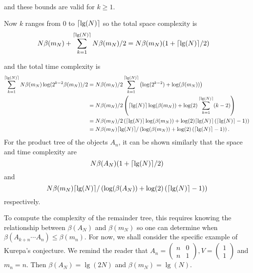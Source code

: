 and these bounds are valid for $k\geq 1$.

Now $k$ ranges from $0$ to $\lceil\lg(N)\rceil$ so the total space complexity is 
\begin{align*} 
N\beta(m_N)+\sum_{k=1}^{\lceil\lg(N)\rceil} N\beta(m_N)/2 &= N\beta(m_N)(1+\lceil\lg(N)\rceil/2)
\end{align*}

and the total time complexity is \begin{align*} 
\sum_{k=1}^{\lceil\lg(N)\rceil} N\beta(m_N)\log(2^{k-2}\beta(m_N))/2 &= N\beta(m_N)/2 \sum_{k=1}^{\lceil\lg(N)\rceil}\left( \log(2^{k-2})+\log(\beta(m_N))\right) \\
&=N\beta(m_N)/2 \left(\lceil\lg(N)\rceil\log(\beta(m_N)) +\log(2) \sum_{k=1}^{\lceil\lg(N)\rceil}(k-2)\right)\\
&=N\beta(m_N)/2 \left(\lceil\lg(N)\rceil\log(\beta(m_N)) +\log(2)\lceil\lg(N)\rceil\left(\lceil\lg(N)\rceil-1\right)\right)\\
&=N\beta(m_N)\lceil\lg(N)\rceil/\left(\log(\beta(m_N))+\log(2)\left(\lceil\lg(N)\rceil-1\right)\right). 
\end{align*}
For the product tree of the objects $A_n$, it can be shown similarly that the space and time complexity are \[ N\beta(A_N)(1+\lceil\lg(N)\rceil/2)\] and \[N\beta(m_N)\lceil\lg(N)\rceil/\left(\log(\beta(A_N))+\log(2)\left(\lceil\lg(N)\rceil-1\right)\right)\] respectively.

To compute the complexity of the remainder tree, this requires knowing the relationship between $\beta(A_N)$ and $\beta(m_N)$ so one can determine when $\beta(A_{k+n}\cdots A_{n})\leq \beta(m_n)$. For now, we shall consider the specific example of Kurepa's conjecture. We remind the reader that $A_n=\begin{pmatrix} n & 0 \\ n & 1 \end{pmatrix}, V=\begin{pmatrix} 1 \\1 \end{pmatrix}$ and $ m_n=n$. Then $\beta(A_N)=\lg(2N)$ and $\beta(m_N)=\lg(N)$. 

